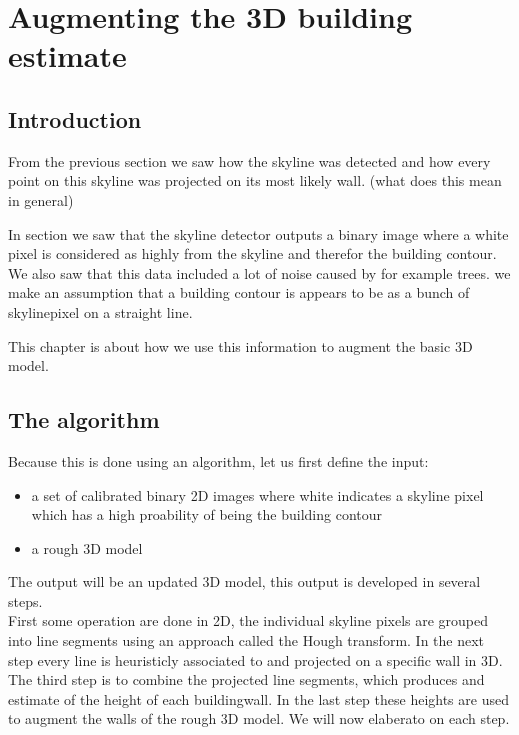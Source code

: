 
\section{Augmenting the 3D building estimate}
\subsection{Introduction}
From the previous section we saw how the skyline was detected and how every point on this skyline was projected on its most likely wall. (what does this mean in general)

	In section %
	we saw that the skyline detector outputs a binary image where a white pixel is considered as highly from the skyline and therefor the building contour.
	We also saw that this data included a lot of noise caused by for example trees. 
	we make an assumption that a building contour is appears to be as a bunch of skylinepixel on a straight line.


This chapter is about how we use this information to augment the basic 3D model.


 
\subsection{The algorithm}
Because this is done using an algorithm, let us first define the input:
\begin{itemize}
\item a set of calibrated binary 2D images where white indicates a skyline pixel which has a high proability of being the building contour
\item a rough 3D model
\end{itemize}
The output will be an updated 3D model, this output is developed in several steps.\\
First some operation are done in 2D, the individual skyline pixels are grouped into line segments using an approach called the Hough transform. In the next step every line is heuristicly associated to and projected on a specific wall in 3D. The third step is to combine the projected line segments, which produces and estimate of the height of each buildingwall. In the last step these heights are used to augment the walls of the rough 3D model.
We will now elaberato on each step.

